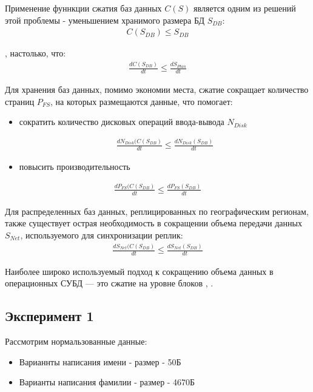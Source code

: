 \documentclass[12pt,a4paper]{article}
\begin{document}
Применение фуннкции сжатия баз данных $C(S)$ является одним из решений этой проблемы -  уменьшением хранимого размера БД $S_{DB}$:
\begin{align}
    C(S_{DB}) \leq S_{DB}
\end{align}

, настолько, что:
  \begin{align}
    \frac{dC(S_{DB})}{dt} \leq \frac{dS_{Plan}}{dt} 
  \end{align}

Для хранения баз данных, помимо экономии места, сжатие сокращает количество страниц $P_{FS}$, на которых размещаются данные, что помогает:
\begin{itemize}
    \item  сократить количество дисковых операций ввода-вывода $N_{Disk}$
 
    \begin{align}
    \frac{dN_{Disk}(C(S_{DB})}{dt} \leq \frac{dN_{Disk}(S_{DB})}{dt} 
  \end{align}

    \item повысить производительность 
 \end{itemize}

  \begin{align}
    \frac{dP_{FS}(C(S_{DB})}{dt} \leq \frac{dP_{FS}(S_{DB})}{dt} 
  \end{align}

 Для распределенных баз данных, реплицированных по географическим регионам, также существует острая необходимость в сокращении объема передачи данных $S_{Net}$, используемого для синхронизации реплик:
  \begin{align}
    \frac{dS_{Net}(C(S_{DB})}{dt} \leq \frac{dS_{Net}(S_{DB})}{dt} 
  \end{align}

Наиболее широко используемый подход к сокращению объема данных в операционных СУБД — это сжатие на уровне блоков \cite{Cormack85}, \cite{Iyer94} .

\subsection{Эксперимент 1}
Рассмотрим нормальзованные данные: 
\begin{itemize}
    \item Варианнты написания имени -  размер - 50Б
    \item Варианты написания фамилии -  размер - 4670Б 
\end{itemize}
\end{document}
